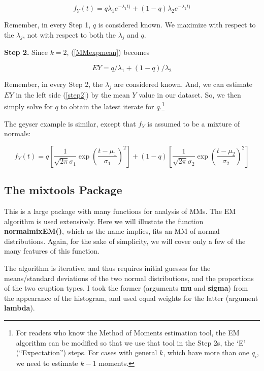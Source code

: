 \documentclass[11pt]{article}
\begin{document}
\begin{equation}
f_Y(t) = q \lambda_1 e^{-\lambda_1 t)} +
(1-q) \lambda_2 e^{-\lambda_2 t)}
\end{equation}

Remember, in every Step 1, $q$ is considered known.  We maximize with
respect to the $\lambda_j$, not with respect to both
the $\lambda_j$ and $q$.

\textbf{Step 2.}  Since $k=2$, (\ref{MMexpmean}) becomes

\begin{equation}
\label{step2}
EY = q / \lambda_1 + (1-q) / \lambda_2
\end{equation}

Remember, in every Step 2, the $\lambda_j$ are considered known.  And,
we can estimate $EY$ in the left side (\ref{step2}) by the mean $Y$
value in our dataset.  So, we then simply solve for $q$ to obtain the
latest iterate for $q$.\footnote{For readers who know the Method of
Moments estimation tool, the EM algorithm can be modified so that we use
that tool in the Step 2s, the `E' (``Expectation'') steps.  For cases
with general $k$, which have more than one $q_i$, we need to estimate
$k-1$ moments.}

The geyser example is similar, except that $f_Y$ is assumed to be a
mixture of normals:

\begin{equation}
f_Y(t) = 
q \left [ \frac{1}{\sqrt{2\pi} \sigma_1}
\exp \left ( \frac{t-\mu_1}{\sigma_1} \right)^2 \right ] + 
(1-q) \left [ \frac{1}{\sqrt{2\pi} \sigma_2}
\exp \left ( \frac{t-\mu_2}{\sigma_2} \right)^2 \right ]
\end{equation}

\subsection{The mixtools Package}

This is a large package with many functions for analysis of MMs.  The EM
algorithm is used extensively.  Here we will illustate the function
\textbf{normalmixEM()}, which as the name implies, fits an MM of normal
distributions.  Again, for the sake of simplicity, we will cover only a
few of the many features of this function.

The algorithm is iterative, and thus requires initial guesses for the
means/standard deviations of the two normal distributions, and the
proportions of the two eruption types.  I took the former (arguments
\textbf{mu} and \textbf{sigma}) from the appearance of the histogram,
and used equal weights for the latter (argument \textbf{lambda}).
\end{document}
